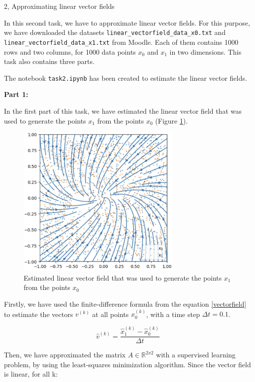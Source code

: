 \documentclass[10pt,a4paper]{article}
\begin{document}
\begin{task}{2, Approximating linear vector fields}

In this second task, we have to approximate linear vector fields. For this purpose, we have downloaded the datasets \texttt{linear\_vectorfield\_data\_x0.txt} and \texttt{linear\_vectorfield\_data\_x1.txt} from Moodle. Each of them contains 1000 rows and two columns, for 1000 data points $x_0$ and $x_1$ in two dimensions. This task also contains three parts.

The notebook \texttt{task2.ipynb} has been created to estimate the linear vector fields.

\bigskip

\noindent \textbf{Part 1:} 

In the first part of this task, we have estimated the linear vector field that was used to generate the points $x_1$ from the points $x_0$ (Figure \ref{vector_field}). 

\begin{figure}[H]
    \centering
    \includegraphics[width=8cm]{images/vector_field.jpg}
    \caption{Estimated linear vector field that was used to generate the points $x_1$ from the points $x_0$}
    \label{vector_field}
\end{figure}

Firstly, we have used the finite-difference formula from the equation \ref{vectorfield} to estimate the vectors $v^{(k)}$ at all points $x_0^{(k)}$, with a time step $\Delta t = 0.1$.

\begin{equation}\label{vectorfield}
    \hat{v}^{(k)} = \frac{\hat{x}^{(k)}_{1} - \hat{x}^{(k)}_{0}}{\Delta t} 
\end{equation}

Then, we have approximated the matrix $A \in \mathbb{R} ^ {2x2}$ with a supervised learning problem, by using the least-squares minimization algorithm. Since the vector field is linear, for all k:


\end{task}
\end{document}
